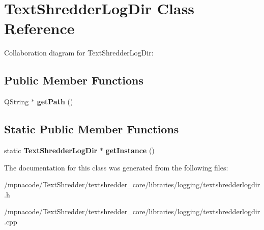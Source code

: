 \section{TextShredderLogDir Class Reference}
\label{class_text_shredder_log_dir}


Collaboration diagram for TextShredderLogDir:
\subsection*{Public Member Functions}
\begin{DoxyCompactItemize}
\item 
QString $\ast$ {\bfseries getPath} ()\label{class_text_shredder_log_dir_a1aa9e85315c7b75509276b7b08e88484}

\end{DoxyCompactItemize}
\subsection*{Static Public Member Functions}
\begin{DoxyCompactItemize}
\item 
static {\bf TextShredderLogDir} $\ast$ {\bfseries getInstance} ()\label{class_text_shredder_log_dir_a794b56a28cfb9a961ac2f07371ff4c04}

\end{DoxyCompactItemize}


The documentation for this class was generated from the following files:\begin{DoxyCompactItemize}
\item 
/mpnacode/TextShredder/textshredder\_\-core/libraries/logging/textshredderlogdir.h\item 
/mpnacode/TextShredder/textshredder\_\-core/libraries/logging/textshredderlogdir.cpp\end{DoxyCompactItemize}
